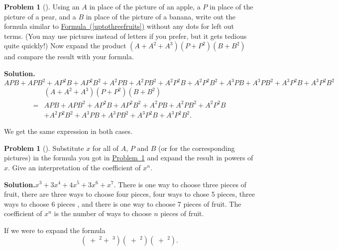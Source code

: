 \documentclass[10pt,]{book}
\theoremstyle{plain}
\theoremstyle{definition}
\newtheorem{activity}[project]{Problem}
\theoremstyle{definition}
\numberwithin{equation}{chapter}
\newcommand{\apple}{\text{🍎}}
\newcommand{\ap}{\apple}
\newcommand{\banana}{\text{🍌}}
\newcommand{\ba}{\banana}
\newcommand{\pear}{\text{🍐}}
\newcommand{\pe}{\pear}
\newcommand{\amp}{&}
\begin{document}
%
\begin{activity}[]\label{twopiecesoffruit}
Using an \(A\) in place of the picture of an apple, a \(P\) in place of the picture of a pear, and a \(B\) in place of the picture of a banana, write out the formula similar to \hyperref[uptothreefruits]{Formula~(\ref{uptothreefruits})} without any dots for left out terms. (You may use pictures instead of letters if you prefer, but it gets tedious quite quickly!) Now expand the product \((A+A^2+A^3)(P+P^2)(B+B^2)\) and compare the result with your formula.%
\par\medskip\noindent%
\textbf{Solution.}\quad \(APB+APB^2 +AP^2B+ AP^2B^2+ A^2PB+A^2PB^2+ A^2P^2B+ A^2P^2B^2+
A^3PB+A^3PB^2 +A^3P^2B+ A^3P^2B^2\)%
\begin{align*}
\amp (A+A^2+A^3)(P+P^2)(B+B^2)\\
=\amp APB+APB^2+AP^2B+AP^2B^2+A^2PB+A^2PB^2+A^2P^2B\\
\amp + A^2P^2B^2+
A^3PB+A^3PB^2+A^3P^2B+A^3P^2B^2.
\end{align*}
%
\par
We get the same expression in both cases.%
\end{activity}
\begin{activity}[]\label{activity-179}
Substitute \(x\) for all of \(A\), \(P\) and \(B\) (or for the corresponding pictures) in the formula you got in \hyperref[twopiecesoffruit]{Problem~\ref{twopiecesoffruit}} and expand the result in powers of \(x\). Give an interpretation of the coefficient of \(x^n\).%
\par\medskip\noindent%
\textbf{Solution.}\quad \(x^3+3x^4+4x^5+3x^6+x^7\). There is one way to choose three pieces of fruit, there are three ways to choose four pieces, four ways to chose 5 pieces, three ways to choose 6 pieces , and there is one way to choose 7 pieces of fruit. The coefficient of \(x^n\) is the number of ways to choose \(n\) pieces of fruit.%
\end{activity}
If we were to expand the formula%
\begin{equation}
(\ap+\ap^2+\ap^3)(\pe+\pe^2)(\ba+\ba^2).\label{threefruitsagain}
\end{equation}
\end{document}

